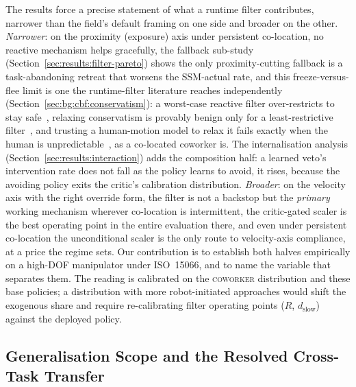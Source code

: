 \documentclass[11pt,a4paper]{report}
\newcommand{\ssm}{SSM}
\newcommand{\iso}{ISO~15066}
\newcommand{\coworker}{\textsc{coworker}}
\begin{document}
The results force a precise statement of what a runtime filter
contributes, narrower than the field's default framing on one side
and broader on the other. \emph{Narrower}: on the proximity
(exposure) axis under persistent co-location, no reactive mechanism
helps gracefully, the fallback sub-study
(Section~\ref{sec:results:filter-pareto}) shows the only
proximity-cutting fallback is a task-abandoning retreat that worsens
the \ssm{}-actual rate, and this freeze-versus-flee limit is one the
runtime-filter literature reaches independently
(Section~\ref{sec:bg:cbf:conservatism}): a worst-case reactive
filter over-restricts to stay safe~\cite{tian2022confidence},
relaxing conservatism is provably benign only for a
least-restrictive filter~\cite{permissivefilter2025}, and trusting a
human-motion model to relax it fails exactly when the human is
unpredictable~\cite{tian2022confidence}, as a co-located coworker
is. The internalisation analysis
(Section~\ref{sec:results:interaction}) adds the composition half: a
learned veto's intervention rate does not fall as the policy learns
to avoid, it rises, because the avoiding policy exits the critic's
calibration distribution. \emph{Broader}: on the velocity axis with
the right override form, the filter is not a backstop but the
\emph{primary} working mechanism wherever co-location is
intermittent, the critic-gated scaler is the best operating point in
the entire evaluation there, and even under persistent co-location
the unconditional scaler is the only route to velocity-axis
compliance, at a price the regime sets. Our contribution is to
establish both halves empirically on a high-DOF manipulator under
\iso{}, and to name the variable that separates them. The reading is
calibrated on the \coworker{} distribution and these base policies; a
distribution with more robot-initiated approaches would shift the
exogenous share and require re-calibrating filter operating points
($R$, $d_{\mathrm{slow}}$) against the deployed policy.

\subsection{Generalisation Scope and the Resolved Cross-Task Transfer}
\label{sec:disc:arch-gen}
\end{document}
